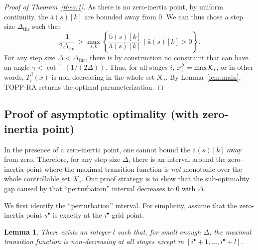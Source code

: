 \documentclass[journal]{IEEEtran}
\theoremstyle{plain}
\newtheorem{lem}{Lemma}
\theoremstyle{definition}
\theoremstyle{definition}
\renewcommand{\vec}[1]{\bm{\mathrm{#1}}}  %
\newcommand{\calK}{\mathcal{K}}
\begin{document}
\begin{proof}[Proof of Theorem~\ref{theo:1}]
  As there is no zero-inertia point, by uniform continuity, the
  $\bar{\vec a}(s)[k]$ are bounded away from 0. We can thus chose a
 step size $\Delta_\mathrm{thr}$ such that
  \begin{equation*}
    \frac{1}{2\Delta_\mathrm{thr}} > \max_{s, k} \left\{
        \frac{\bar{\vec b}(s)[k]}{\bar{\vec a}(s)[k]} \mid \bar{\vec
          a}(s)[k] >0   \right\}.
  \end{equation*}
  For any step size $\Delta < \Delta_\mathrm{thr}$, there is by
  construction no constraint that can have an angle
  $\gamma < \cot^{-1}{(1 / (2 \Delta))}$. Thus, for all stages $i$,
  $x^\beta_i=\max{\cal K}_i$, or in other words, $T_i^\beta(x)$ is
  non-decreasing in the whole set $\calK_i$. By Lemma~\ref{lem:main},
  TOPP-RA returns the optimal parameterization.
\end{proof}

\subsection{Proof of asymptotic optimality (with zero-inertia point)}
\label{sec:proof-with}

In the presence of a zero-inertia point, one cannot bound the
$\bar{\vec a}(s)[k]$ away from zero. Therefore, for any step size
$\Delta$, there is an interval around the zero-inertia point where the
maximal transition function is \emph{not} monotonic over the whole
controllable set $\calK_i$. Our proof strategy is to show that the
sub-optimality gap caused by that ``perturbation'' interval decreases
to $0$ with $\Delta$.

We first identify the ``perturbation'' interval. For simplicity,
assume that the zero-inertia point $s^\bullet$ is exactly at the
$i^\bullet$ grid point.

\begin{lem}
  \label{lem:perturbation}
  There exists an integer $l$ such that, for small enough $\Delta$,
  the maximal transition function is non-decreasing at all stages
  except in $[i^\bullet+1,\dots,i^\bullet+l]$.
\end{lem}
\end{document}
